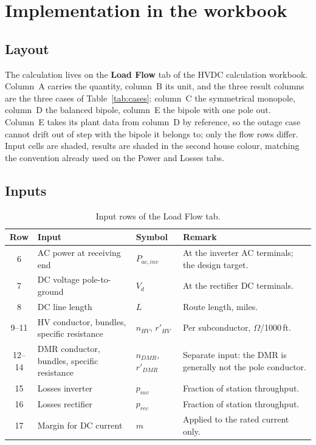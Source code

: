 \section{Implementation in the workbook}
\label{sec:implementation}

\subsection{Layout}
The calculation lives on the \textbf{Load Flow} tab of the HVDC calculation
workbook. Column~A carries the quantity, column~B its unit, and the three
result columns are the three cases of Table~\ref{tab:cases}: column~C the
symmetrical monopole, column~D the balanced bipole, column~E the bipole with
one pole out. Column~E takes its plant data from column~D by reference, so the
outage case cannot drift out of step with the bipole it belongs to; only the
flow rows differ. Input cells are shaded, results are shaded in the second
house colour, matching the convention already used on the Power and Losses
tabs.

\subsection{Inputs}
\begin{table}[htbp]
  \centering
  \small
  \renewcommand{\arraystretch}{1.25}
  \begin{tabularx}{\linewidth}{@{}c l l X@{}}
    \toprule
    \textbf{Row} & \textbf{Input} & \textbf{Symbol} & \textbf{Remark} \\
    \midrule
    6  & AC power at receiving end   & $P_{ac,inv}$ & At the inverter AC terminals; the design target. \\
    7  & DC voltage pole-to-ground   & $V_{d}$      & At the rectifier DC terminals. \\
    8  & DC line length              & $L$          & Route length, miles. \\
    9--11 & HV conductor, bundles, specific resistance
                                     & $n_{HV}$, $r'_{HV}$
                                     & Per subconductor, $\Omega$/1000\,ft. \\
    12--14 & DMR conductor, bundles, specific resistance
                                     & $n_{DMR}$, $r'_{DMR}$
                                     & Separate input: the DMR is generally not the pole conductor. \\
    15 & Losses inverter             & $p_{inv}$    & Fraction of station throughput. \\
    16 & Losses rectifier            & $p_{rec}$    & Fraction of station throughput. \\
    17 & Margin for DC current       & $m$          & Applied to the rated current only. \\
    \bottomrule
  \end{tabularx}
  \caption{Input rows of the Load Flow tab.}
  \label{tab:inputs}
\end{table}

